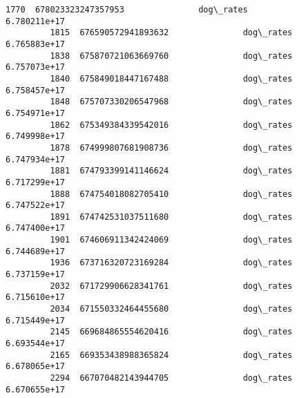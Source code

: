 \documentclass[11pt]{article}
\begin{document}
\begin{Verbatim}[commandchars=\\\{\}]
         1770  678023323247357953               dog\_rates           6.780211e+17   
         1815  676590572941893632               dog\_rates           6.765883e+17   
         1838  675870721063669760               dog\_rates           6.757073e+17   
         1840  675849018447167488               dog\_rates           6.758457e+17   
         1848  675707330206547968               dog\_rates           6.754971e+17   
         1862  675349384339542016               dog\_rates           6.749998e+17   
         1878  674999807681908736               dog\_rates           6.747934e+17   
         1881  674793399141146624               dog\_rates           6.717299e+17   
         1888  674754018082705410               dog\_rates           6.747522e+17   
         1891  674742531037511680               dog\_rates           6.747400e+17   
         1901  674606911342424069               dog\_rates           6.744689e+17   
         1936  673716320723169284               dog\_rates           6.737159e+17   
         2032  671729906628341761               dog\_rates           6.715610e+17   
         2034  671550332464455680               dog\_rates           6.715449e+17   
         2145  669684865554620416               dog\_rates           6.693544e+17   
         2165  669353438988365824               dog\_rates           6.678065e+17   
         2294  667070482143944705               dog\_rates           6.670655e+17   
         

\end{Verbatim}
\end{document}
